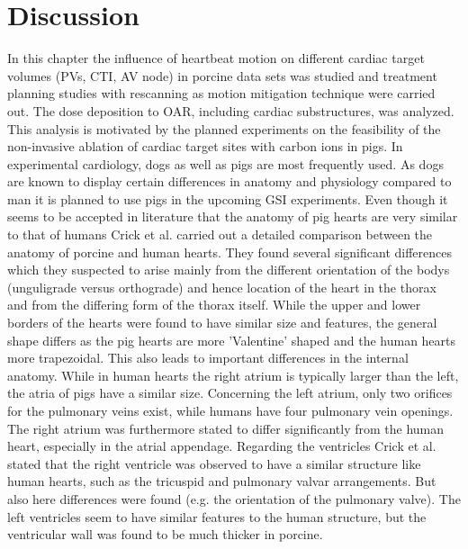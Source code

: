 \newpage

\section{Discussion}
\label{pigs:diss}
In this chapter the influence of heartbeat motion on different cardiac target volumes (PVs, CTI, AV node) in porcine data sets was studied 
and treatment planning studies with rescanning as motion mitigation technique were carried out. The dose deposition to OAR, including 
cardiac substructures, was analyzed. This analysis is motivated by the planned experiments on the feasibility of the non-invasive ablation of 
cardiac target sites with carbon ions in pigs. In experimental cardiology, dogs as well as pigs are most frequently used. As dogs are known to 
display certain differences in anatomy and physiology compared to man \cite{Hug86, Cri98} it is planned to use pigs in the upcoming GSI 
experiments.\newline
\newline
Even though it seems to be accepted in literature that the anatomy of pig hearts are very similar to that of humans 
\cite{Lum66, Dou72, Hug86, Coo91, Whi93} Crick et al. \cite{Cri98} carried out a detailed comparison between the 
anatomy of porcine and human hearts. They found several significant differences which they suspected to arise mainly from the different 
orientation of the bodys (unguligrade versus orthograde) and hence location of the heart in the thorax and from the differing form of 
the thorax itself. While the upper and lower borders of the hearts were found to have similar size and features, the general shape differs as 
the pig hearts are more 'Valentine' shaped and the human hearts more trapezoidal. This also leads to important differences in the internal 
anatomy. While in human hearts the right atrium is typically larger than the left, the atria of pigs have a similar size. Concerning the left 
atrium, only two orifices for the pulmonary veins exist, while humans have four pulmonary vein openings. The right atrium was furthermore 
stated to differ significantly from the human heart, especially in the atrial appendage. 
Regarding the ventricles Crick et al. stated that the right ventricle was observed to have a similar structure like human hearts, such as 
the tricuspid and pulmonary valvar arrangements. But also here differences were found (e.g. the orientation of the pulmonary valve). 
The left ventricles seem to have similar features to the human structure, but the ventricular wall was found to be much thicker in porcine. 
